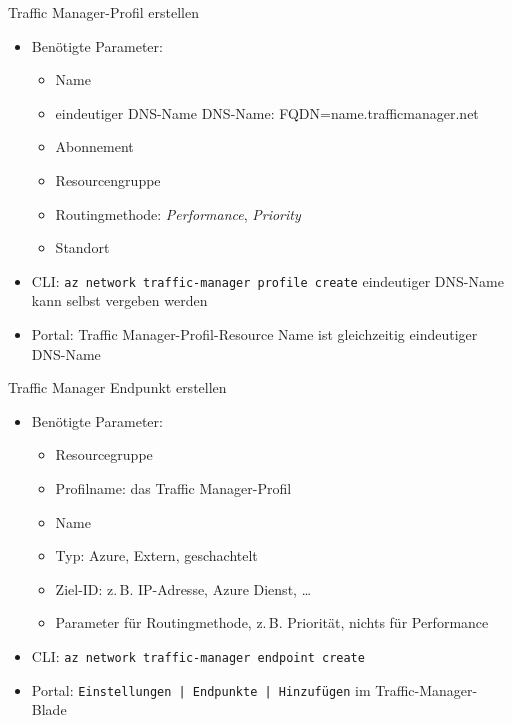 \begin{flashcard}[Definition]{Traffic Manager-Profil erstellen}
        \begin{itemize}
            \item Benötigte Parameter:
                \begin{itemize}
                    \item Name
                    \item eindeutiger DNS-Name\newline
                        DNS-Name: FQDN=name.trafficmanager.net
                    \item Abonnement
                    \item Resourcengruppe
                    \item Routingmethode: \emph{Performance}, \emph{Priority}
                    \item Standort
                \end{itemize}
            \item CLI: \texttt{az network traffic-manager profile create}\newline
                eindeutiger DNS-Name kann selbst vergeben werden
            \item Portal: Traffic Manager-Profil-Resource\newline
                Name ist gleichzeitig eindeutiger DNS-Name
        \end{itemize}
\end{flashcard}

\begin{flashcard}[Definition]{Traffic Manager Endpunkt erstellen}
    \begin{itemize}
        \item Benötigte Parameter:
            \begin{itemize}
                \item Resourcegruppe
                \item Profilname: das Traffic Manager-Profil
                \item Name
                \item Typ: Azure, Extern, geschachtelt
                \item Ziel-ID: z.\,B. IP-Adresse, Azure Dienst, \ldots
                \item Parameter für Routingmethode, z.\,B. Priorität, nichts für Performance
            \end{itemize}
        \item CLI: \texttt{az network traffic-manager endpoint create}
        \item Portal: \texttt{Einstellungen | Endpunkte | Hinzufügen} im Traffic-Manager-Blade
    \end{itemize}
\end{flashcard}
